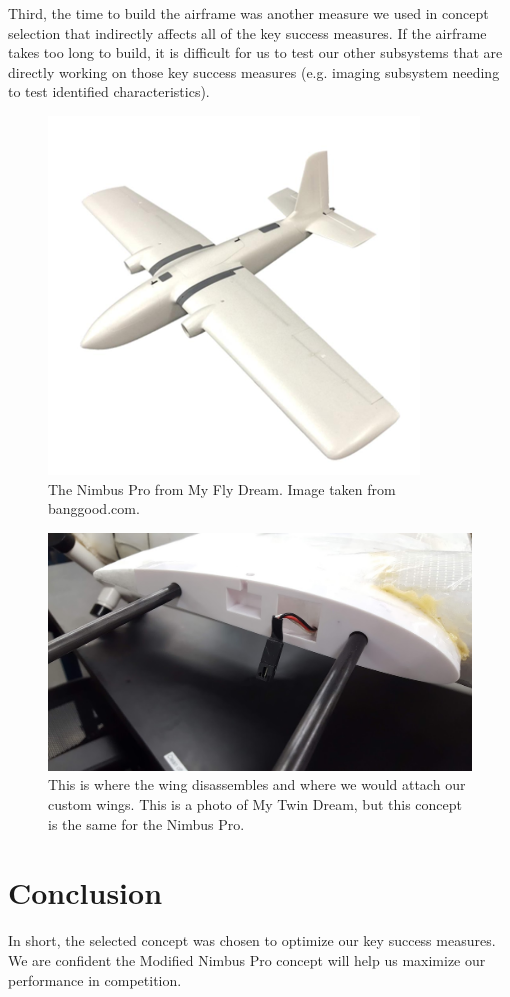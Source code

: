 \documentclass[]{auvsi_doc}
\begin{document}
Third, the time to build the airframe was another measure we used in concept selection that indirectly affects all of the key success measures. If the airframe takes too long to build, it is difficult for us to test our other subsystems that are directly working on those key success measures (e.g. imaging subsystem needing to test identified characteristics).

\begin{figure}[h!]
	\centering
	\includegraphics[scale=0.7]{figs/NimbusPro}
	\caption{The Nimbus Pro from My Fly Dream. Image taken from banggood.com.}
	\label{fig:nimbus}
\end{figure}

\begin{figure}[h!]
	\centering
	\includegraphics[width=.8\columnwidth]{figs/wing}
	\caption{This is where the wing disassembles and where we would attach our custom wings. This is a photo of My Twin Dream, but this concept is the same for the Nimbus Pro.}
	\label{fig:wing}
\end{figure}

\section{Conclusion}

In short, the selected concept was chosen to optimize our key success measures. We are confident the Modified Nimbus Pro concept will help us maximize our performance in competition.
\end{document}
